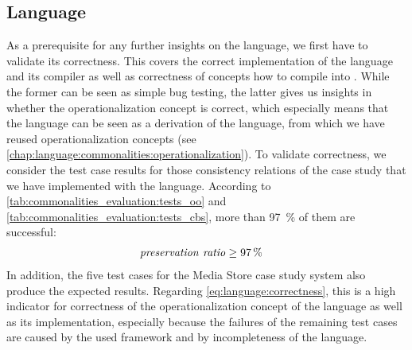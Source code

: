 \subsection*{\Commonalities Language}

As a prerequisite for any further insights on the \commonalities language, we first have to validate its correctness.
This covers the correct implementation of the language and its compiler as well as correctness of concepts how to compile \commonalities into \reactions.
While the former can be seen as simple bug testing, the latter gives us insights in whether the operationalization concept is correct, which especially means that the language can be seen as a derivation of the \mappings language, from which we have reused operationalization concepts (see \autoref{chap:language:commonalities:operationalization}).
To validate correctness, we consider the test case results for those consistency relations of the case study that we have implemented with the \commonalities language.
According to \autoref{tab:commonalities_evaluation:tests_oo} and \autoref{tab:commonalities_evaluation:tests_cbs}, more than \SI{97}{\percent} of them are successful:
\begin{align*}
    &
    \mathit{preservation\ ratio} \ge \SI{97}{\percent}
\end{align*}
In addition, the five test cases for the Media Store case study system also produce the expected results.
Regarding \autoref{eq:language:correctness}, this is a high indicator for correctness of the operationalization concept of the \commonalities language as well as its implementation, especially because the failures of the remaining test cases are caused by the used \vitruv framework and by incompleteness of the \commonalities language.

